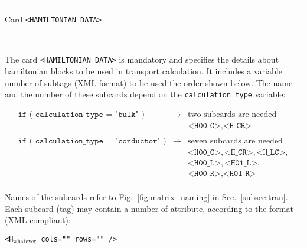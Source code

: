 \begin{centering}
\rule{2.0in}{0.01in} Card {\tt <HAMILTONIAN\_DATA>} \rule{2.0in}{0.01in}
\end{centering}\\

\noindent The card {\tt <HAMILTONIAN\_DATA>} is mandatory and specifies
the details about hamiltonian blocks to be used in transport calculation.
It includes a variable number of subtags (XML format)
to be used the order shown below. The name and the number of these subcards
depend on the {\tt calculation\_type} variable:

%
%
\begin{displaymath}
\begin{array}{lll}
\texttt{if ( calculation\_type = "bulk" )}         & \rightarrow &
                                                     \textrm{two subcards are needed}\\
\texttt{}                                          & \texttt{}   &
                                                     \texttt{<H00\_C>},\texttt{<H\_CR>}\\
\texttt{}                                          & \texttt{}   & \textbf{}\\
\texttt{if ( calculation\_type = "conductor" )}    & \rightarrow &
                                                     \textrm{seven subcards are needed}\\

\texttt{}                                          & \texttt{}   &
                                                     \texttt{<H00\_C>},
                                                     \texttt{<H\_CR>},\texttt{<H\_LC>},\\
\texttt{}                                          & \texttt{}   &
                                                     \texttt{<H00\_L>},\texttt{<H01\_L>},\\
\texttt{}                                          & \texttt{}   &
                                                     \texttt{<H00\_R>}, \texttt{<H01\_R>}\\
\end{array}
\end{displaymath}
%
%

\noindent Names of the subcards refer to Fig.~\ref{fig:matrix_naming} in
Sec.~\ref{subsec:tran}.
Each subcard (tag) may contain a number of attribute, according to the
format (XML compliant):
%
%
\begin{description}
\item
   {\tt <H$_{\text{whatever}}$  cols=""  rows=""  />}
\end{description}
%
%


